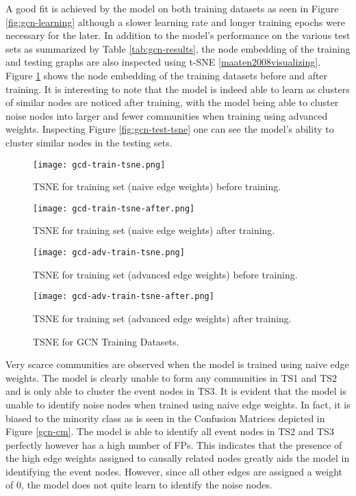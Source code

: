 A good fit is achieved by the model on both training datasets as seen
in Figure \ref{fig:gcn-learning} although a slower learning rate and
longer training epochs were necessary for the later. In addition to
the model's performance on the various test sets as summarized by Table
\ref{tab:gcn-results}, the node embedding of the training and testing
graphs are also inspected using t-SNE \ref{maaten2008visualizing}.
Figure \ref{fig:gcn-train-tsne} shows the node embedding of the
training datasets before and after training. It is interesting to note
that the model is indeed able to learn as clusters of similar nodes
are noticed after training, with the model being able to cluster noise
nodes into larger and fewer communities when training using advanced
weights. Inspecting Figure \ref{fig:gcn-test-tsne} one can see the
model's ability to cluster similar nodes in the testing sets.

\begin{figure}[htb]
  \centering
  \begin{minipage}{0.49\textwidth}
    \centering
    \texttt{[image: gcd-train-tsne.png]}
    \caption{TSNE for training set (naive edge weights) before training.}
  \end{minipage}
  \begin{minipage}{0.49\textwidth}
    \centering
    \texttt{[image: gcd-train-tsne-after.png]}
    \caption{TSNE for training set (naive edge weights) after training.}
  \end{minipage}
  \begin{minipage}{0.49\textwidth}
    \centering
    \texttt{[image: gcd-adv-train-tsne.png]}
    \caption{TSNE for training set (advanced edge weights) before training.}
  \end{minipage}
  \begin{minipage}{0.49\textwidth}
    \centering
    \texttt{[image: gcd-adv-train-tsne-after.png]}
    \caption{TSNE for training set (advanced edge weights) after training.}
  \end{minipage}
  \caption{TSNE for GCN Training Datasets.}
  \label{fig:gcn-train-tsne}
\end{figure}

Very scarce communities are observed when the model is trained using
naive edge weights. The model is clearly unable to form any
communities in TS1 and TS2 and is only able to cluster the event nodes
in TS3. It is evident that the model is unable to identify noise nodes
when trained using naive edge weights. In fact, it is biased to the
minority class as is seen in the Confusion Matrices depicted in Figure
\ref{gcn-cm}. The model is able to identify all event nodes in TS2 and
TS3 perfectly however has a high number of FPs. This indicates that
the presence of the high edge weights assigned to causally related
nodes greatly aids the model in identifying the event nodes. However,
since all other edges are assigned a weight of 0, the model does not
quite learn to identify the noise nodes.

